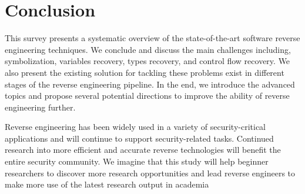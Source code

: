 \chapter{Conclusion}\label{sec-conclusion}

This survey presents a systematic overview of the state-of-the-art software reverse engineering techniques. We conclude and discuss the main challenges including, symbolization, variables recovery, types recovery, and control flow recovery.
We also present the existing solution for tackling these problems exist in different stages of the reverse engineering pipeline. In the end, we introduce the advanced topics and propose several potential directions to improve the ability of reverse engineering further.

Reverse engineering has been widely used in a variety of security-critical applications and will continue to support security-related tasks. Continued research into more efficient and accurate reverse technologies will benefit the entire security community. We imagine that this study will help beginner researchers to discover more research opportunities and lead reverse engineers to make more use of the latest research output in academia

\newpage
